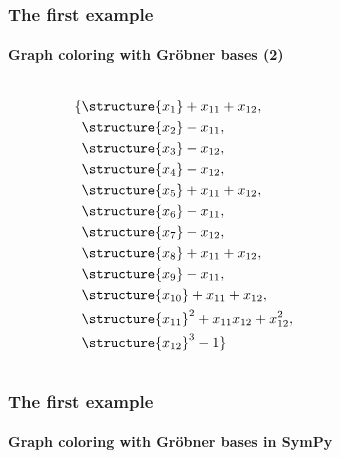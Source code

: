 \documentclass{beamer}
\begin{document}
\begin{frame}
    \frametitle{The first example}
    \framesubtitle{Graph coloring with Gr\"{o}bner bases (2)}

    \begin{columns}
        \begin{column}[l]{0.4\textwidth}
            \scriptsize
            \begin{align*}
                \{& \structure{x_{1}} + x_{11} + x_{12},              \\
                  & \structure{x_{2}} - x_{11},                       \\
                  & \structure{x_{3}} - x_{12},                       \\
                  & \structure{x_{4}} - x_{12},                       \\
                  & \structure{x_{5}} + x_{11} + x_{12},              \\
                  & \structure{x_{6}} - x_{11},                       \\
                  & \structure{x_{7}} - x_{12},                       \\
                  & \structure{x_{8}} + x_{11} + x_{12},              \\
                  & \structure{x_{9}} - x_{11},                       \\
                  & \structure{x_{10}} + x_{11} + x_{12},             \\
                  & \structure{x_{11}}^2 + x_{11} x_{12} + x_{12}^2,  \\
                  & \structure{x_{12}}^3 - 1 \}
            \end{align*}
        \end{column}
        \begin{column}[r]{0.4\textwidth}
            \begin{center}
                
            \end{center}
        \end{column}
    \end{columns}
\end{frame}

\begin{frame}[fragile]
    \frametitle{The first example}
    \framesubtitle{Graph coloring with Gr\"{o}bner bases in SymPy}

    
\end{frame}
\end{document}
